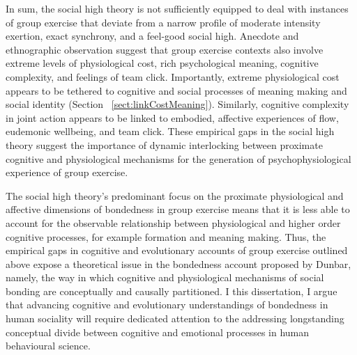 \begin{CJK}{UTF8}{gbsn}

In sum, the social high theory is not sufficiently equipped to deal with instances of group exercise that deviate from a narrow profile of moderate intensity exertion, exact synchrony, and a feel-good social high.  Anecdote and ethnographic observation suggest that group exercise contexts also involve extreme levels of physiological cost, rich psychological meaning, cognitive complexity, and feelings of team click.  Importantly, extreme physiological cost appears to be tethered to cognitive and social processes of meaning making and social identity (Section ~\ref{sect:linkCostMeaning}).  Similarly, cognitive complexity in joint action appears to be linked to embodied, affective experiences of flow, eudemonic wellbeing, and team click.  These empirical gaps in the social high theory suggest the importance of dynamic interlocking between proximate cognitive and physiological mechanisms for the generation of psychophysiological experience of group exercise.

The social high theory's predominant focus on the proximate physiological and affective dimensions of bondedness in group exercise means that it is less able to account for the observable relationship between physiological and higher order cognitive processes, for example formation and meaning making.  Thus, the empirical gaps in cognitive and evolutionary accounts of group exercise outlined above expose a theoretical issue in the bondedness account proposed by Dunbar, namely, the way in which cognitive and physiological mechanisms of social bonding are conceptually and causally partitioned.
I this dissertation, I argue that advancing cognitive and evolutionary understandings of bondedness in human sociality will require dedicated attention to the addressing longstanding conceptual divide between cognitive and emotional processes in human behavioural science.



\end{CJK}
